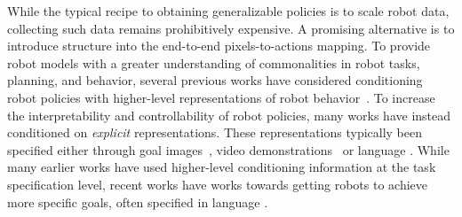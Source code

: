 \documentclass[conference,dvipsnames]{IEEEtran}
\begin{document}
While the typical recipe to obtaining generalizable policies is to scale robot data, collecting such data remains prohibitively expensive. A promising alternative is to introduce structure into the end-to-end pixels-to-actions mapping. To provide robot models with a greater understanding of commonalities in robot tasks, planning, and behavior, several previous works have considered conditioning robot policies with higher-level representations of robot behavior~\cite{Shankar-2020-126755, pmlr-v100-lynch20a, hakhamaneshi2022hierarchicalfewshotimitationskill, wang2017robustimitationdiversebehaviors}. To increase the interpretability and controllability of robot policies, many works have instead conditioned on \textit{explicit} representations. These representations typically been specified either through goal images~\cite{nair2018visualreinforcementlearningimagined, ding2020goalconditionedimitationlearning}, video demonstrations~\cite{sontakke2023roboclipdemonstrationlearnrobot, du2023learninguniversalpoliciestextguided} or language \cite{goyal2021zeroshottaskadaptationusing, jang2022bczzeroshottaskgeneralization, zhou2024bridginglanguageactionsurvey}. While many earlier works have used higher-level conditioning information at the task specification level, recent works have works towards getting robots to achieve more specific goals, often specified in language \cite{huang2022languagemodelszeroshotplanners, ahn2022icanisay, huang2022innermonologueembodiedreasoning, black2023zeroshotroboticmanipulationpretrained}. 
\end{document}
